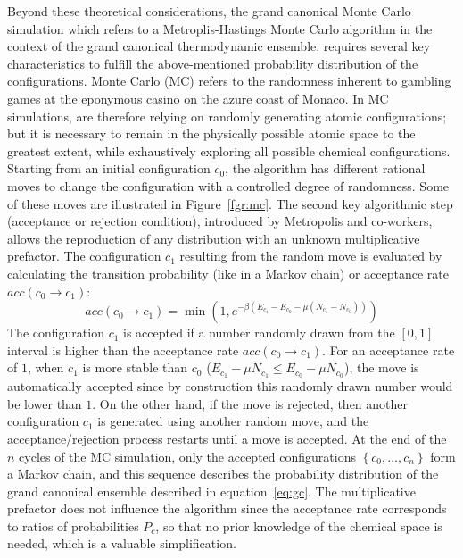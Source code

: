 \documentclass[main.tex]{subfiles}
\begin{document}
Beyond these theoretical considerations, the grand canonical Monte Carlo simulation which refers to a Metroplis-Hastings Monte Carlo algorithm in the context of the grand canonical thermodynamic ensemble, requires several key characteristics to fulfill the above-mentioned probability distribution of the configurations. Monte Carlo (MC) refers to the randomness inherent to gambling games at the eponymous casino on the azure coast of Monaco. In MC simulations, are therefore relying on randomly generating atomic configurations; but it is necessary to remain in the physically possible atomic space to the greatest extent, while exhaustively exploring all possible chemical configurations. 
Starting from an initial configuration $c_0$, the algorithm has different rational moves to change the configuration with a controlled degree of randomness. Some of these moves are illustrated in Figure~\ref{fgr:mc}. The second key algorithmic step (acceptance or rejection condition), introduced by Metropolis and co-workers, allows the reproduction of any distribution with an unknown multiplicative prefactor.\autocite{Metropolis1949} The configuration $c_1$ resulting from the random move is evaluated by calculating the transition probability (like in a Markov chain) or acceptance rate $acc(c_0 \rightarrow c_1)$: 
\begin{equation}
  acc(c_0 \rightarrow c_1) = \min\left(1, e^{-\beta\left(E_{c_1}-E_{c_0}-\mu \left(N_{c_1}-N_{c_0}\right)\right) }\right)
\end{equation}
The configuration $c_1$ is accepted if a number randomly drawn from the $[0,1]$ interval is higher than the acceptance rate $acc(c_0 \rightarrow c_1)$. For an acceptance rate of $1$, when $c_1$ is more stable than $c_0$ ($E_{c_1}-\mu N_{c_1}\leq E_{c_0}-\mu N_{c_0}$), the move is automatically accepted since by construction this randomly drawn number would be lower than $1$. On the other hand, if the move is rejected, then another configuration $c_1$ is generated using another random move, and the acceptance/rejection process restarts until a move is accepted. At the end of the $n$ cycles of the MC simulation, only the accepted configurations $\left\{c_0,\ldots,c_n\right\}$ form a Markov chain, and this sequence describes the probability distribution of the grand canonical ensemble described in equation~\ref{eq:gc}. The multiplicative prefactor does not influence the algorithm since the acceptance rate corresponds to ratios of probabilities $P_c$, so that no prior knowledge of the chemical space is needed, which is a valuable simplification.
\end{document}
